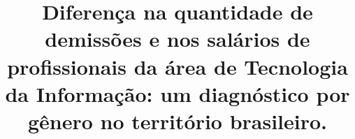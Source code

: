 \title{Diferença na quantidade de demissões e nos salários de profissionais da área de Tecnologia da Informação: um diagnóstico por gênero no território brasileiro.  \\
}